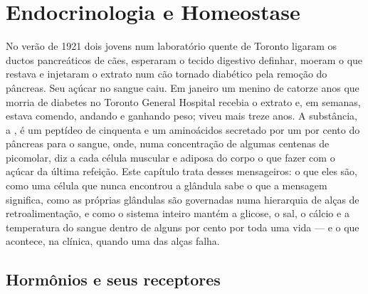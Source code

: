\chapter{Endocrinologia e Homeostase}\label{ch:b3:endocrinology}

No verão de 1921 dois jovens num laboratório quente de Toronto ligaram
os ductos pancreáticos de cães, esperaram o tecido digestivo definhar,
moeram o que restava e injetaram o extrato num cão tornado diabético
pela remoção do pâncreas. Seu açúcar no sangue caiu. Em janeiro um
menino de catorze anos que morria de diabetes no Toronto General
Hospital recebia o extrato e, em semanas, estava comendo, andando e
ganhando peso; viveu mais treze anos. A substância, a , é um
peptídeo de cinquenta e um aminoácidos secretado por um por cento do
pâncreas para o sangue, onde, numa concentração de algumas centenas de
picomolar, diz a cada célula muscular e adiposa do corpo o que fazer com
o açúcar da última refeição. Este capítulo trata desses mensageiros: o
que eles são, como uma célula que nunca encontrou a glândula sabe o que
a mensagem significa, como as próprias glândulas são governadas numa
hierarquia de alças de retroalimentação, e como o sistema inteiro mantém
a glicose, o sal, o cálcio e a temperatura do sangue dentro de alguns
por cento por toda uma vida --- e o que acontece, na clínica, quando uma
das alças falha.

\section{Hormônios e seus receptores}

